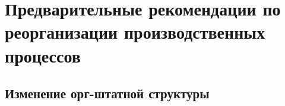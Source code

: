 






















\section{Предварительные рекомендации по реорганизации производственных процессов}

\subsection{Изменение орг-штатной структуры}

